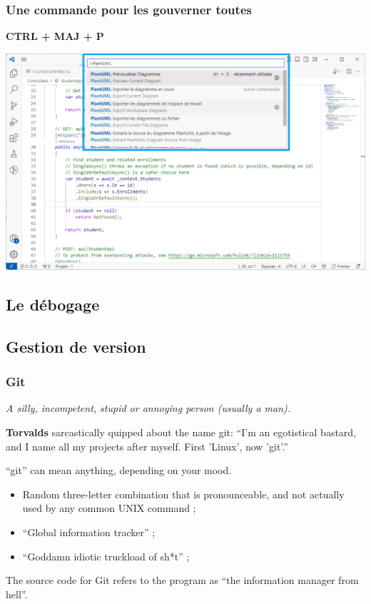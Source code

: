 \begin{frame}
    \frametitle{Une commande pour les gouverner toutes}
    \centering
    \Huge
    \textbf{CTRL + MAJ + P}

    \includegraphics[height=0.4\linewidth]{figures/environnement/commande-ultime}
\end{frame}


\subsection{Le débogage}
\label{subsec:debogage}


\subsection{Gestion de version}
\label{subsec:cvs}

\begin{frame}
    \frametitle{Git}

    \emph{A silly, incompetent, stupid or annoying person (usually a man).}

    \textbf{Torvalds} sarcastically quipped about the name git:
    \enquote{I'm an egotistical bastard, and I name all my projects after myself. First 'Linux', now 'git'.}

    \enquote{git} can mean anything, depending on your mood.
    \begin{itemize}
        \item Random three-letter combination that is pronounceable, and not actually used by any common UNIX command ;
        \item \enquote{Global information tracker} ;
        \item \enquote{Goddamn idiotic truckload of sh*t} ;
    \end{itemize}

    The source code for Git refers to the program as \enquote{the information manager from hell}.
\end{frame}


